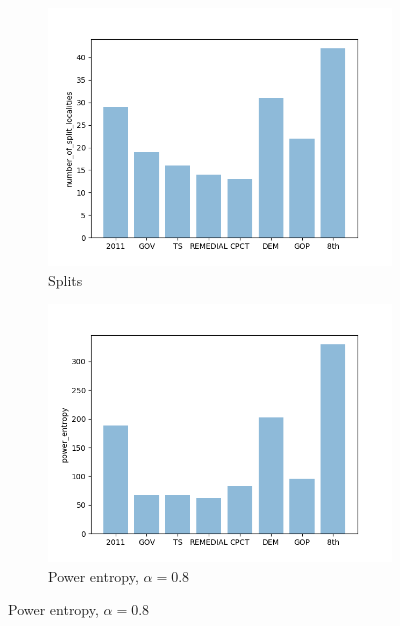 \documentclass{mgggarticle}
\begin{document}
\begin{figure}
\begin{subfigure}{0.4\textwidth}
\centering
\includegraphics[width=\textwidth]{figs/bars/number_of_split_localities_bar.png}
\caption{Splits}
\end{subfigure}
\begin{subfigure}{0.4\textwidth}
\centering
\includegraphics[width=\textwidth]{figs/bars/power_entropy_bar.png}
\caption{Power entropy, $\alpha = 0.8$}
\end{subfigure}


\end{figure}
\end{document}
